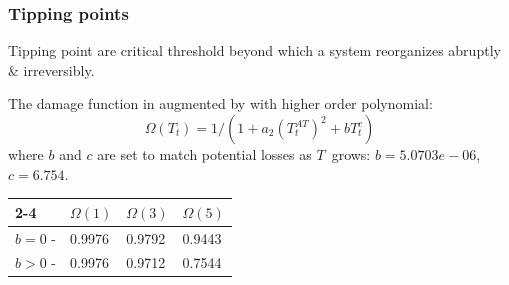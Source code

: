 \documentclass[xcolor=x11names,compress,aspectratio=169]{beamer}%
\makeatletter
\newenvironment{stepitemizewithalert}{\begin{itemize}[<+-| alert@+>]}{\end{itemize} }
\renewenvironment{itemize}{\begin{compactitemize}[<+-| alert@+>]}{\end{compactitemize}}
\renewenvironment{stepitemizewithalert}{\begin{compactitemize}[<+-| alert@+>]}{\end{compactitemize}}
\renewenvironment{stepitemizewithalert}{\begin{itemize}}{\end{itemize}}
\makeatother
\begin{document}
\begin{frame}%
%

\frametitle{Tipping points}%


\begin{stepitemizewithalert}
\item Tipping point are critical threshold beyond which a system reorganizes
abruptly \& irreversibly.%
\vspace{1.5ex}%


\item The damage function in \cite{nordhaus2017revisiting} augmented by
\cite{weitzman2012ghg} with higher order polynomial:%
\[
\Omega\left(  T_{t}\right)  =1/(1+a_{2}\left(  T_{t}^{AT}\right)  ^{2}%
+bT_{t}^{c})
\]
where $b$ and $c$ are set to match potential losses as $T$\ grows:
$b=5.0703e-06$, $c=6.754$.%
\vspace{1.5ex}%

\end{stepitemizewithalert}

\begin{center}%
\begin{tabular}
[c]{llll}\cline{2-4}
& $\Omega\left(  1\right)  $ & $\Omega\left(  3\right)  $ & $\Omega\left(
5\right)  $\\\hline
$b=0$ - \cite{nordhaus2017revisiting} & 0.9976 & 0.9792 & 0.9443\\
$b>0$ - \cite{weitzman2012ghg} & 0.9976 & 0.9712 & 0.7544\\\hline
\end{tabular}



\end{center}

%

\transboxout
\end{frame}%
%
\end{document}
